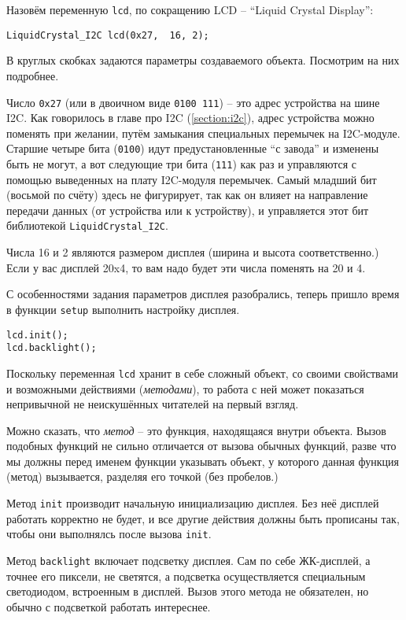 \documentclass[../sparc.tex]{subfiles}
\begin{document}
Назовём переменную \texttt{lcd}, по сокращению \gls{LCD} -- ``Liquid Crystal
Display'':

\begin{verbatim}
LiquidCrystal_I2C lcd(0x27,  16, 2);
\end{verbatim}

В круглых скобках задаются параметры создаваемого объекта.  Посмотрим на них
подробнее.

Число \texttt{0x27} (или в двоичном виде \texttt{0100 111}) -- это адрес
устройства на шине I2C.  Как говорилось в главе про I2C (\ref{section:i2c}),
адрес устройства можно поменять при желании, путём замыкания специальных
перемычек на I2C-модуле.  Старшие четыре бита (\texttt{0100}) идут
предустановленные ``с завода'' и изменены быть не могут, а вот следующие три
бита (\texttt{111}) как раз и управляются с помощью выведенных на плату
I2C-модуля перемычек.  Самый младший бит (восьмой по счёту) здесь не фигурирует,
так как он влияет на направление передачи данных (от устройства или к
устройству), и управляется этот бит библиотекой \texttt{LiquidCrystal\_I2C}.

Числа 16 и 2 являются размером дисплея (ширина и высота соответственно.)  Если у
вас дисплей 20x4, то вам надо будет эти числа поменять на 20 и 4.

С особенностями задания параметров дисплея разобрались, теперь пришло время в
функции \texttt{setup} выполнить настройку дисплея.

\begin{verbatim}
lcd.init();
lcd.backlight();
\end{verbatim}

Поскольку переменная \texttt{lcd} хранит в себе сложный объект, со своими
свойствами и возможными действиями (\emph{методами}), то работа с ней может показаться
непривычной не неискушённых читателей на первый взгляд.

Можно сказать, что \emph{метод} -- это функция, находящаяся внутри объекта.
Вызов подобных функций не сильно отличается от вызова обычных функций, разве что
мы должны перед именем функции указывать объект, у которого данная функция
(метод) вызывается, разделяя его точкой (без пробелов.)

Метод \texttt{init} производит начальную инициализацию дисплея.  Без неё дисплей
работать корректно не будет, и все другие действия должны быть прописаны так,
чтобы они выполнялсь после вызова \texttt{init}.

Метод \texttt{backlight} включает подсветку дисплея.  Сам по себе ЖК-дисплей, а
точнее его пиксели, не светятся, а подсветка осуществляется специальным
светодиодом, встроенным в дисплей.  Вызов этого метода не обязателен, но обычно
с подсветкой работать интереснее.
\end{document}
